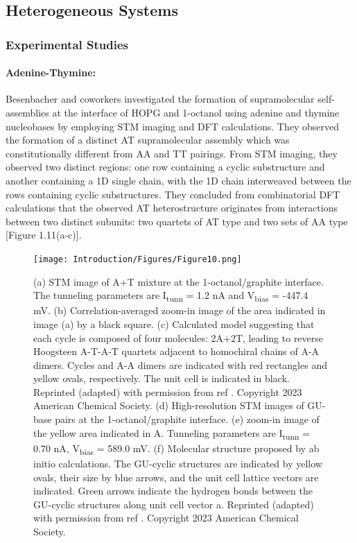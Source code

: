 \subsection{Heterogeneous Systems}
\subsubsection{Experimental Studies}
\paragraph{Adenine-Thymine:}Besenbacher and coworkers investigated the formation of supramolecular self-assemblies at the interface of HOPG and 1-octanol using adenine and thymine nucleobases by employing STM imaging and DFT calculations.\supercite{mamdouh_supramolecular_2006} They observed the formation of a distinct AT supramolecular assembly which was constitutionally different from AA and TT pairings. From STM imaging, they observed two distinct regions: one row containing a cyclic substructure and another containing a 1D single chain, with the 1D chain interweaved between the rows containing cyclic substructures. They concluded from combinatorial DFT calculations that the observed AT heterostructure originates from interactions between two distinct subunits: two quartets of AT type and two sets of AA type [Figure 1.11(a-c)].

\begin{figure}
    \centering
    \texttt{[image: Introduction/Figures/Figure10.png]}
    \caption[STM images of A-T and G-U mixtures at the 1-octanol/graphite interface]{(a) STM image of A+T mixture at the 1-octanol/graphite interface. The tunneling parameters are I\textsubscript{tunn} = 1.2 nA and V\textsubscript{bias} = -447.4 mV. (b) Correlation-averaged zoom-in image of the area indicated in image (a) by a black square. (c) Calculated model suggesting that each cycle is composed of four molecules: 2A+2T, leading to reverse Hoogsteen A-T-A-T quartets adjacent to homochiral chains of A-A dimers. Cycles and A-A dimers are indicated with red rectangles and yellow ovals, respectively. The unit cell is indicated in black. Reprinted (adapted) with permission from ref \supercite{mamdouh_supramolecular_2006}. Copyright 2023 American Chemical Society. (d) High-resolution STM images of GU-base pairs at the 1-octanol/graphite interface. (e) zoom-in image of the yellow area indicated in A. Tunneling parameters are I\textsubscript{tunn} = 0.70 nA, V\textsubscript{bias} = 589.0 mV. (f) Molecular structure proposed by ab initio calculations. The GU-cyclic structures are indicated by yellow ovals, their size by blue arrows, and the unit cell lattice vectors are indicated. Green arrows indicate the hydrogen bonds between the GU-cyclic structures along unit cell vector a. Reprinted (adapted) with permission from ref \supercite{mamdouh_two-dimensional_2008}. Copyright 2023 American Chemical Society.}
    \label{fig:figure11}
\end{figure}

